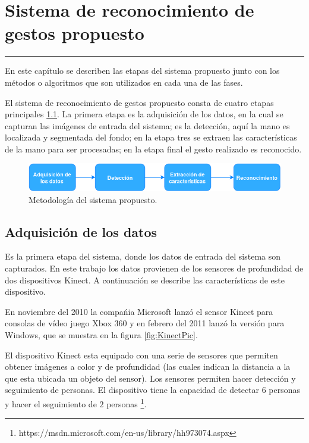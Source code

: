 \chapter{Sistema de reconocimiento de gestos propuesto}\label{capit:cap3}
\vspace{-2.0325ex}%
\noindent
\rule{\textwidth}{0.5pt}
\vspace{-5.5ex}%
\newcommand{\pushline}{\Indp}%

En este cap\'itulo se describen las etapas del sistema propuesto junto con los métodos o algoritmos que son utilizados en cada una de las fases.
 
El sistema de reconocimiento de gestos propuesto consta de cuatro etapas principales \ref{fig:MyHGR}. La primera etapa es la adquisición de los datos, en la cual se capturan las imágenes de entrada del sistema; es la detección, aquí la mano es localizada y segmentada del fondo; en la etapa tres se extraen las características de la mano para ser procesadas; en la etapa final el gesto realizado es reconocido.   

\begin{figure}[h!]
\begin{center}
\includegraphics[scale=.6]{./Figures/MyHGR.png}
\end{center}
\caption{Metodología del sistema propuesto.}
\label{fig:MyHGR}
\end{figure}  
  
\section{Adquisición de los datos}\label{sec:KinectSensor} 

Es la primera etapa del sistema, donde los datos de entrada del sistema son capturados. En este trabajo los datos provienen de los sensores de profundidad de dos dispositivos Kinect. A continuación se describe las características de este dispositivo. 

En noviembre del 2010 la compa\'nia Microsoft lanz\'o el sensor Kinect para consolas de vídeo juego Xbox 360 y en febrero del 2011 lanz\'o la versi\'on para Windows, que se muestra en la figura \ref{fig:KinectPic}.  

El dispositivo Kinect esta equipado con una serie de sensores que permiten obtener imágenes a color y de profundidad (las cuales indican la distancia a la que esta ubicada un objeto del sensor). Los sensores permiten hacer detección y seguimiento de personas. El dispositivo tiene la capacidad de detectar $6$ personas y hacer el seguimiento de $2$ personas \footnote{https://msdn.microsoft.com/en-us/library/hh973074.aspx}.    
  
